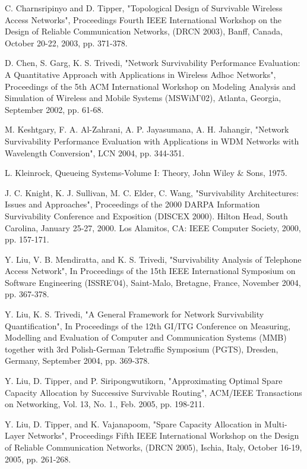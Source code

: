 \documentclass[onecolumn,conference]{IEEEtran}
\begin{document}
    \begin{thebibliography}{00}
         C. Charnsripinyo and D. Tipper, "Topological Design of Survivable Wireless Access Networks", Proceedings Fourth IEEE International Workshop on the Design of Reliable Communication Networks, (DRCN 2003), Banff, Canada, October 20-22, 2003, pp. 371-378.

         D. Chen, S. Garg, K. S. Trivedi, "Network Survivability Performance Evaluation: A Quantitative Approach with Applications in Wireless Adhoc Networks", Proceedings of the 5th ACM International Workshop on Modeling Analysis and Simulation of Wireless and Mobile Systems (MSWiM'02), Atlanta, Georgia, September 2002, pp. 61-68.

         M. Keshtgary, F. A. Al-Zahrani, A. P. Jayasumana, A. H. Jahangir, "Network Survivability Performance Evaluation with Applications in WDM Networks with Wavelength Conversion", LCN 2004, pp. 344-351.

         L. Kleinrock, Queueing Systems-Volume I: Theory, John Wiley \& Sons, 1975.

         J. C. Knight, K. J. Sullivan, M. C. Elder, C. Wang, "Survivability Architectures: Issues and Approaches", Proceedings of the 2000 DARPA Information Survivability Conference and Exposition (DISCEX 2000). Hilton Head, South Carolina, January 25-27, 2000. Los Alamitos, CA: IEEE Computer Society, 2000, pp. 157-171.

         Y. Liu, V. B. Mendiratta, and K. S. Trivedi, "Survivability Analysis of Telephone Access Network", In Proceedings of the 15th IEEE International Symposium on Software Engineering (ISSRE'04), Saint-Malo, Bretagne, France, November 2004, pp. 367-378.

         Y. Liu, K. S. Trivedi, "A General Framework for Network Survivability Quantification", In Proceedings of the 12th GI/ITG Conference on Measuring, Modelling and Evaluation of Computer and Communication Systems (MMB) together with 3rd Polish-German Teletraffic Symposium (PGTS), Dresden, Germany, September 2004, pp. 369-378.

         Y. Liu, D. Tipper, and P. Siripongwutikorn, "Approximating Optimal Spare Capacity Allocation by Successive Survivable Routing", ACM/IEEE Transactions on Networking, Vol. 13, No. 1., Feb. 2005, pp. 198-211.

         Y. Liu, D. Tipper, and K. Vajanapoom, "Spare Capacity Allocation in Multi-Layer Networks", Proceedings Fifth IEEE International Workshop on the Design of Reliable Communication Networks, (DRCN 2005), Ischia, Italy, October 16-19, 2005, pp. 261-268.


\end{thebibliography}
\end{document}

